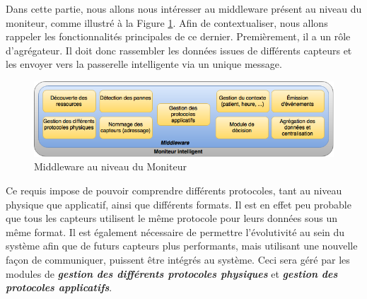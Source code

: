 Dans cette partie, nous allons nous intéresser au middleware présent au niveau du moniteur, comme illustré à la Figure \ref{4}. Afin de contextualiser, nous allons rappeler les fonctionnalités principales de ce dernier. Premièrement, il a un rôle d'agrégateur. Il doit donc rassembler les données issues de différents capteurs et les envoyer vers la passerelle intelligente via un unique message. 
\newline
\begin{figure}[h!]
	\hspace*{-3cm}
	\centering
	\includegraphics[width=1.5\textwidth]{Figure4.png}
	\caption{Middleware au niveau du Moniteur}
	\label{4}
\end{figure}

Ce requis impose de pouvoir comprendre différents protocoles, tant au niveau physique que applicatif, ainsi que différents formats. Il est en effet peu probable que tous les capteurs utilisent le même protocole pour leurs données sous un même format. Il est également nécessaire de permettre l'évolutivité au sein du système afin que de futurs capteurs plus performants, mais utilisant une nouvelle façon de communiquer, puissent être intégrés au système. Ceci sera géré par les modules de \textbf{\textit{gestion des différents protocoles physiques}} et \textbf{\textit{gestion des protocoles applicatifs}}.
\newline

